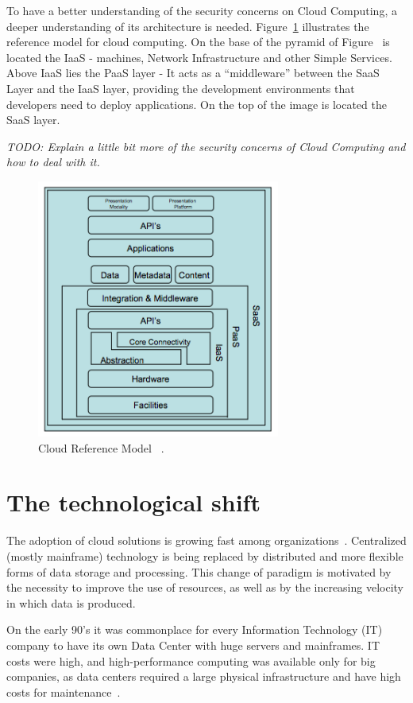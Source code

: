 To have a better understanding of the security concerns on Cloud Computing, a deeper understanding of its architecture is needed. 
Figure~\ref{fig:cloudmodel} illustrates the reference model for cloud computing. On the base of the pyramid of Figure~\label{fig:cloudstach} is located the IaaS - machines, Network Infrastructure and other Simple Services. Above IaaS lies the PaaS layer - It acts as a ``middleware'' between the SaaS Layer and the IaaS layer, providing the development environments that developers need to deploy applications. On the top of the image is located the SaaS layer. 

\textit{TODO: Explain a little bit more of the security concerns of Cloud Computing and how to deal with it.}

\begin{figure}[ht!]
\centering
\includegraphics[width=80mm]{Imagens/cloudreferencemodel.png}
\caption{Cloud Reference Model ~\cite{alliance2009}.\label{fig:cloudmodel}}
\end{figure}


\section{The technological shift}
The adoption of cloud solutions is growing fast among organizations~\cite{Armbrust09m.:above}.
Centralized (mostly mainframe) technology is being replaced by distributed and more flexible forms of data storage and processing.
This change of paradigm is motivated by the necessity to improve the use of resources, as well as by the increasing velocity in which data is produced.

On the early 90's it was commonplace for every Information Technology (IT) company to have its own Data Center with huge servers and mainframes. 
IT costs were high, and high-performance computing was available only for big companies, as data centers required a large physical infrastructure and have high costs for maintenance~\cite{Armbrust09m.:above}.

